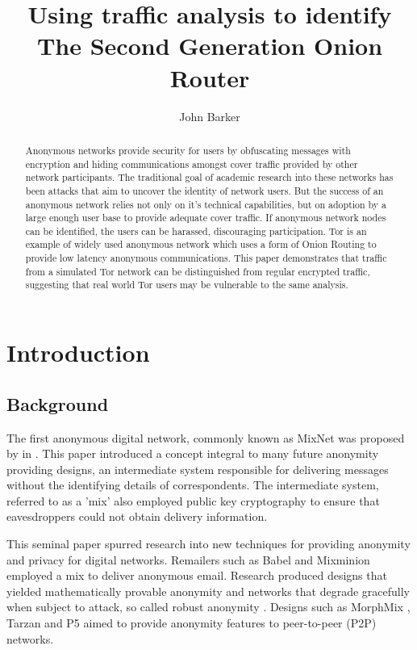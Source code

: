 \documentclass{ecuthesis}
\title{Using traffic analysis to identify The Second Generation Onion Router}
\author{John Barker}
\begin{document}
\maketitle

\tableofcontents
\listoftables
\listoffigures

\begin{abstract}
\thispagestyle{empty}

Anonymous networks provide security for users by obfuscating messages with
encryption and hiding communications amongst cover traffic provided by other
network participants. The traditional goal of academic research into these
networks has been attacks that aim to uncover the identity of network users.
But the success of an anonymous network relies not only on it's technical
capabilities, but on adoption by a large enough user base to provide adequate
cover traffic. If anonymous network nodes can be identified, the users
can be harassed, discouraging participation. Tor is an example of widely used
anonymous network which uses a form of Onion Routing to provide low latency
anonymous communications. This paper demonstrates that traffic from a simulated
Tor network can be distinguished from regular encrypted traffic, suggesting that
real world Tor users may be vulnerable to the same analysis.

\end{abstract}

\chapter{Introduction}

\section{Background}

The first anonymous digital network, commonly known as MixNet was proposed by
\citeauthor{Chaum:1981p296} in 
\parencite{Chaum:1981p296}. This paper introduced a concept integral to many
future anonymity providing designs, an intermediate system responsible for
delivering messages without the identifying details of correspondents. The
intermediate system, referred to as a 'mix' also employed public key
cryptography to ensure that eavesdroppers could not obtain delivery information.

This seminal paper spurred research into new techniques for providing anonymity
and privacy for digital networks. Remailers such as Babel
\parencite{Gulcu:1996p1662} and Mixminion \parencite{Danezis:2003ys} employed a
mix to deliver anonymous email. Research produced designs that yielded
mathematically provable anonymity
\parencite{Chaum:1988p5869,Waidner:1989p5870,Berman:2004p303} and networks that
degrade gracefully when subject to attack, so called robust anonymity
\parencite{Waidner:1989p5870,Jakobsson:1998p5137}. Designs such as MorphMix
\parencite{Rennhard:2002p4559}, Tarzan \parencite{Freedman:2002kx} and P5
\parencite{P5Sherwood:2005p5872} aimed to provide anonymity features to
peer-to-peer (P2P) networks. 
\end{document}
